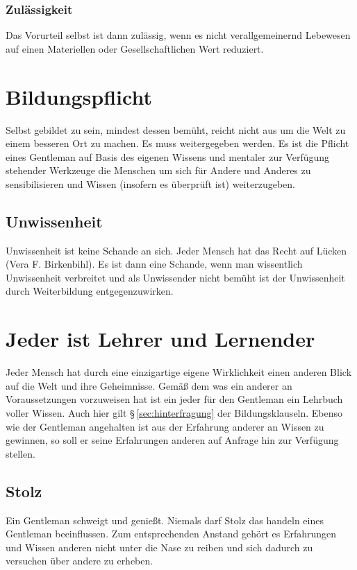             \subsubsection{Zulässigkeit}
                Das Vorurteil selbst ist dann zulässig, wenn es nicht verallgemeinernd Lebewesen auf einen Materiellen oder Gesellschaftlichen Wert reduziert.

    \section{Bildungspflicht}
        Selbst gebildet zu sein, mindest dessen bemüht, reicht nicht aus um die Welt zu einem besseren Ort zu machen. 
        Es muss weitergegeben werden. 
        Es ist die Pflicht eines Gentleman auf Basis des eigenen Wissens und mentaler zur Verfügung stehender Werkzeuge die Menschen um sich für Andere und Anderes zu sensibilisieren und Wissen (insofern es überprüft ist) weiterzugeben.

        \subsection{Unwissenheit}
            Unwissenheit ist keine Schande an sich. \glqq Jeder Mensch hat das Recht auf Lücken\grqq \\  (Vera F. Birkenbihl). Es ist dann eine Schande, wenn man wissentlich Unwissenheit verbreitet und als Unwissender nicht bemüht ist der Unwissenheit durch Weiterbildung entgegenzuwirken.

    \section{Jeder ist Lehrer und Lernender}
        Jeder Mensch hat durch eine einzigartige eigene Wirklichkeit einen anderen Blick auf die Welt und ihre Geheimnisse. Gemäß dem was ein anderer an Voraussetzungen vorzuweisen hat ist ein jeder für den Gentleman ein Lehrbuch voller Wissen. Auch hier gilt \S\,\ref{sec:hinterfragung} der Bildungsklauseln. 
        Ebenso wie der Gentleman angehalten ist aus der Erfahrung anderer an Wissen zu gewinnen, so soll er seine Erfahrungen anderen auf Anfrage hin zur Verfügung stellen.

        \subsection{Stolz}
        Ein Gentleman schweigt und genießt. Niemals darf Stolz das handeln eines Gentleman beeinflussen. Zum entsprechenden Anstand gehört es Erfahrungen und Wissen anderen nicht unter die Nase zu reiben und sich dadurch zu versuchen über andere zu erheben.

